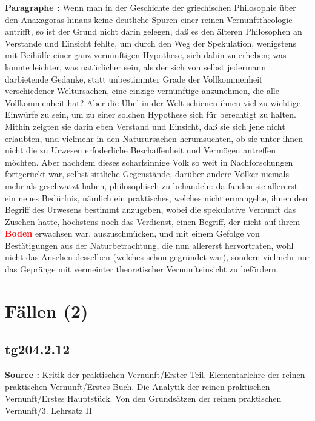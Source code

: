 \documentclass[a4paper,12pt,twoside]{book}
\newcommand{\match}[1]{\textcolor{red}{\textbf{#1}}}
\newcommand{\unnumberedsection}[1]{
	\section*{#1}
	\addcontentsline{toc}{section}{#1}
	\markright{#1}
}
\begin{document}
	\textbf{Paragraphe : }Wenn man in der Geschichte der griechischen Philosophie über den Anaxagoras hinaus keine deutliche Spuren einer reinen Vernunfttheologie antrifft, so ist der Grund nicht darin gelegen, daß es den älteren Philosophen an Verstande und Einsicht fehlte, um durch den Weg der Spekulation, wenigstens mit Beihülfe einer ganz vernünftigen Hypothese, sich dahin zu erheben; was konnte leichter, was natürlicher sein, als der sich von selbst jedermann darbietende Gedanke, statt unbestimmter Grade der Vollkommenheit verschiedener Weltursachen, eine einzige vernünftige anzunehmen, die alle Vollkommenheit hat? Aber die Übel in der Welt schienen ihnen viel zu wichtige Einwürfe zu sein, um zu einer solchen Hypothese sich für berechtigt zu halten. Mithin zeigten sie darin eben Verstand und Einsicht, daß sie sich jene nicht erlaubten, und vielmehr in den Naturursachen herumsuchten, ob sie unter ihnen nicht die zu Urwesen erfoderliche Beschaffenheit und Vermögen antreffen möchten. Aber nachdem dieses scharfsinnige Volk so weit in Nachforschungen fortgerückt war, selbst sittliche Gegenstände, darüber andere Völker niemals mehr als geschwatzt haben, philosophisch zu behandeln: da fanden sie allererst ein neues Bedürfnis, nämlich ein praktisches, welches nicht ermangelte, ihnen den Begriff des Urwesens bestimmt anzugeben, wobei die spekulative Vernunft das Zusehen hatte, höchstens noch das Verdienst, einen Begriff, der nicht auf ihrem \match{Boden} erwachsen war, auszuschmücken, und mit einem Gefolge von Bestätigungen aus der Naturbetrachtung, die nun allererst hervortraten, wohl nicht das Ansehen desselben (welches schon gegründet war), sondern vielmehr nur das Gepränge mit vermeinter theoretischer Vernunfteinsicht zu befördern. 
	
	\unnumberedsection{Fällen (2)} 
	\subsection*{tg204.2.12} 
	\textbf{Source : }Kritik der praktischen Vernunft/Erster Teil. Elementarlehre der reinen praktischen Vernunft/Erstes Buch. Die Analytik der reinen praktischen Vernunft/Erstes Hauptstück. Von den Grundsätzen der reinen praktischen Vernunft/3. Lehrsatz II\\  
	
\end{document}
